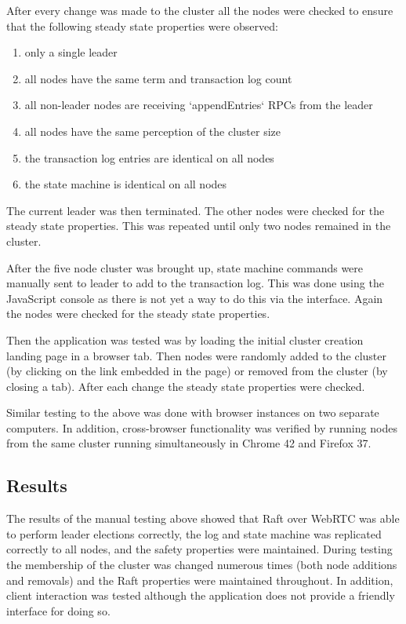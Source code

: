 \documentclass{acmtog} %
\begin{document}
After every change was made to the cluster all the nodes were checked
to ensure that the following steady state properties were observed:
\begin{enumerate}
\item only a single leader
\item all nodes have the same term and transaction log count
\item all non-leader nodes are receiving `appendEntries` RPCs from the leader
\item all nodes have the same perception of the cluster size
\item the transaction log entries are identical on all nodes
\item the state machine is identical on all nodes
\end{enumerate}

The current leader was then terminated. The other nodes were checked
for the steady state properties. This was repeated until only two
nodes remained in the cluster.

After the five node cluster was brought up, state machine commands
were manually sent to leader to add to the transaction log. This was
done using the JavaScript console as there is not yet a way to do this
via the interface. Again the nodes were checked for the steady state
properties.

Then the application was tested was by loading the initial cluster
creation landing page in a browser tab. Then nodes were randomly added
to the cluster (by clicking on the link embedded in the page) or
removed from the cluster (by closing a tab). After each change the
steady state properties were checked.

Similar testing to the above was done with browser instances on two
separate computers. In addition, cross-browser functionality was
verified by running nodes from the same cluster running simultaneously
in Chrome 42 and Firefox 37.

\subsection{Results}

The results of the manual testing above showed that Raft over WebRTC
was able to perform leader elections correctly, the log and state
machine was replicated correctly to all nodes, and the safety
properties were maintained. During testing the membership of the
cluster was changed numerous times (both node additions and removals)
and the Raft properties were maintained throughout. In addition,
client interaction was tested although the application does not
provide a friendly interface for doing so.
\end{document}
